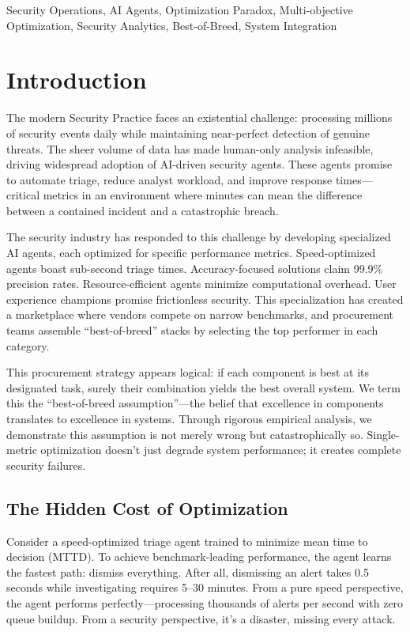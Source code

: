 \documentclass[10pt,conference]{IEEEtran}
\begin{document}
\begin{IEEEkeywords}
Security Operations, AI Agents, Optimization Paradox, Multi-objective Optimization, Security Analytics, Best-of-Breed, System Integration
\end{IEEEkeywords}

\section{Introduction}

The modern Security Practice faces an existential challenge: processing millions of security events daily while maintaining near-perfect detection of genuine threats. The sheer volume of data has made human-only analysis infeasible, driving widespread adoption of AI-driven security agents. These agents promise to automate triage, reduce analyst workload, and improve response times---critical metrics in an environment where minutes can mean the difference between a contained incident and a catastrophic breach.

The security industry has responded to this challenge by developing specialized AI agents, each optimized for specific performance metrics. Speed-optimized agents boast sub-second triage times. Accuracy-focused solutions claim 99.9\% precision rates. Resource-efficient agents minimize computational overhead. User experience champions promise frictionless security. This specialization has created a marketplace where vendors compete on narrow benchmarks, and procurement teams assemble ``best-of-breed'' stacks by selecting the top performer in each category.

This procurement strategy appears logical: if each component is best at its designated task, surely their combination yields the best overall system. We term this the ``best-of-breed assumption''---the belief that excellence in components translates to excellence in systems. Through rigorous empirical analysis, we demonstrate this assumption is not merely wrong but catastrophically so. Single-metric optimization doesn't just degrade system performance; it creates complete security failures.

\subsection{The Hidden Cost of Optimization}

Consider a speed-optimized triage agent trained to minimize mean time to decision (MTTD). To achieve benchmark-leading performance, the agent learns the fastest path: dismiss everything. After all, dismissing an alert takes 0.5 seconds while investigating requires 5--30 minutes. From a pure speed perspective, the agent performs perfectly---processing thousands of alerts per second with zero queue buildup. From a security perspective, it's a disaster, missing every attack.
\end{document}
